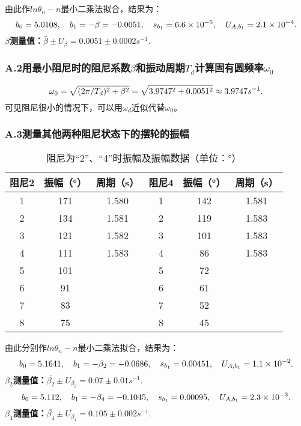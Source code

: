 \documentclass{ctexart}
\begin{document}
\noindent 由此作$ln\theta_n-n$最小二乘法拟合，结果为：
\begin{equation}
  b_0=5.0108 ,\quad b_1=-\beta=-0.0051,\quad s_{b_1}=6.6\times 10^{-5}, \quad U_{A,b_1}=2.1\times 10^{-4}. \notag
\end{equation}
\textbf{$\beta$测量值：}$\bar{\beta}\pm U_{\beta}= 0.0051 \pm 0.0002s^{-1}.$

\subsubsection*{A.2\quad 用最小阻尼时的阻尼系数$\beta$和振动周期$T_d$计算固有圆频率$\omega_0$}
\begin{equation}
  \omega_0=\sqrt{(2\pi/T_d)^2+\beta^2}=\sqrt{3.9747^2+0.0051^2}\approx 3.9747s^{-1}. \notag
\end{equation}
可见阻尼很小的情况下，可以用$\omega_d$近似代替$\omega_0$。


\subsubsection*{A.3\quad 测量其他两种阻尼状态下的摆轮的振幅}
\begin{table}[!htbp]
  \centering
  \caption{阻尼为“2”、“4”时振幅及振幅数据（单位：°）}\vspace{1em} \label{tab:aStrangeTable}%
  \begin{tabular}{ccc|ccc}
  \toprule
  阻尼2& 振幅（°）& 周期（s）& 阻尼4& 振幅（°）& 周期（s）\\
  \midrule
  1& 171& 1.580& 1& 142& 1.581 \\
  2& 134& 1.581& 2& 119& 1.583 \\
  3& 121& 1.582& 3& 101& 1.583 \\
  4& 111& 1.583& 4& 86& 1.583 \\
  5& 101&  & 5& 72&   \\
  6& 91&  & 6& 61&  \\
  7& 83&  & 7& 52&  \\
  8& 75&  & 8& 45&  \\
  \bottomrule
  \end{tabular}
  \end{table}

\noindent 由此分别作$ln\theta_n-n$最小二乘法拟合，结果为：
\begin{equation}
    b_0=5.1641 ,\quad b_1=-\beta_2=-0.0686,\quad s_{b_1}=0.00451, \quad U_{A,b_1}=1.1\times 10^{-2}. \notag
  \end{equation}
\textbf{$\beta_2$测量值：}$\bar{\beta_2}\pm U_{\beta_2}= 0.07 \pm 0.01s^{-1}.$  
\begin{equation}
  b_0=5.112 ,\quad b_1=-\beta_4=-0.1045,\quad s_{b_1}=0.00095, \quad U_{A,b_1}=2.3\times 10^{-3}. \notag
\end{equation}
\textbf{$\beta_4$测量值：}$\bar{\beta_4}\pm U_{\beta_4}= 0.105 \pm 0.002s^{-1}.$  
\end{document}
